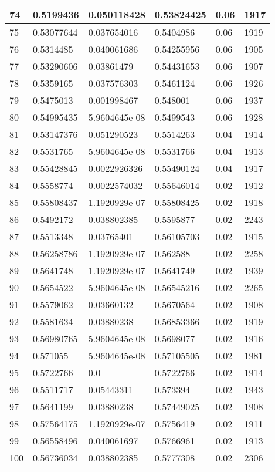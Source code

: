 \begin{longtable}{|l|l|l|l|l|l|}
74 & 0.5199436 & 0.050118428 & 0.53824425 & 0.06 & 1917 \\ \hline 
75 & 0.53077644 & 0.037654016 & 0.5404986 & 0.06 & 1919 \\ \hline 
76 & 0.5314485 & 0.040061686 & 0.54255956 & 0.06 & 1905 \\ \hline 
77 & 0.53290606 & 0.03861479 & 0.54431653 & 0.06 & 1907 \\ \hline 
78 & 0.5359165 & 0.037576303 & 0.5461124 & 0.06 & 1926 \\ \hline 
79 & 0.5475013 & 0.001998467 & 0.548001 & 0.06 & 1937 \\ \hline 
80 & 0.54995435 & 5.9604645e-08 & 0.5499543 & 0.06 & 1928 \\ \hline 
81 & 0.53147376 & 0.051290523 & 0.5514263 & 0.04 & 1914 \\ \hline 
82 & 0.5531765 & 5.9604645e-08 & 0.5531766 & 0.04 & 1913 \\ \hline 
83 & 0.55428845 & 0.0022926326 & 0.55490124 & 0.04 & 1917 \\ \hline 
84 & 0.5558774 & 0.0022574032 & 0.55646014 & 0.02 & 1912 \\ \hline 
85 & 0.55808437 & 1.1920929e-07 & 0.55808425 & 0.02 & 1918 \\ \hline 
86 & 0.5492172 & 0.038802385 & 0.5595877 & 0.02 & 2243 \\ \hline 
87 & 0.5513348 & 0.03765401 & 0.56105703 & 0.02 & 1915 \\ \hline 
88 & 0.56258786 & 1.1920929e-07 & 0.562588 & 0.02 & 2258 \\ \hline 
89 & 0.5641748 & 1.1920929e-07 & 0.5641749 & 0.02 & 1939 \\ \hline 
90 & 0.5654522 & 5.9604645e-08 & 0.56545216 & 0.02 & 2265 \\ \hline 
91 & 0.5579062 & 0.03660132 & 0.5670564 & 0.02 & 1908 \\ \hline 
92 & 0.5581634 & 0.03880238 & 0.56853366 & 0.02 & 1919 \\ \hline 
93 & 0.56980765 & 5.9604645e-08 & 0.5698077 & 0.02 & 1916 \\ \hline 
94 & 0.571055 & 5.9604645e-08 & 0.57105505 & 0.02 & 1981 \\ \hline 
95 & 0.5722766 & 0.0 & 0.5722766 & 0.02 & 1914 \\ \hline 
96 & 0.5511717 & 0.05443311 & 0.573394 & 0.02 & 1943 \\ \hline 
97 & 0.5641199 & 0.03880238 & 0.57449025 & 0.02 & 1908 \\ \hline 
98 & 0.57564175 & 1.1920929e-07 & 0.5756419 & 0.02 & 1911 \\ \hline 
99 & 0.56558496 & 0.040061697 & 0.5766961 & 0.02 & 1913 \\ \hline 
100 & 0.56736034 & 0.038802385 & 0.5777308 & 0.02 & 2306 \\ \hline 
\end{longtable}